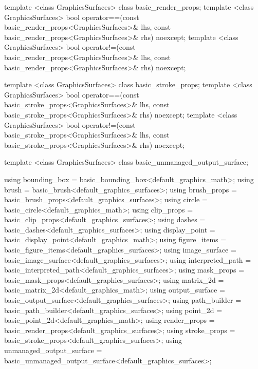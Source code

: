 \begin{codeblock}
{{{{    template <class GraphicsSurfaces>    
    class basic_render_props;
    template <class GraphicsSurfaces>
    bool operator==(const basic_render_props<GraphicsSurfaces>& lhs,
      const basic_render_props<GraphicsSurfaces>& rhs) noexcept;
    template <class GraphicsSurfaces>
    bool operator!=(const basic_render_props<GraphicsSurfaces>& lhs,
      const basic_render_props<GraphicsSurfaces>& rhs) noexcept;
    
    template <class GraphicsSurfaces>
    class basic_stroke_props;
    template <class GraphicsSurfaces>
    bool operator==(const basic_stroke_props<GraphicsSurfaces>& lhs,
      const basic_stroke_props<GraphicsSurfaces>& rhs) noexcept;
    template <class GraphicsSurfaces>
    bool operator!=(const basic_stroke_props<GraphicsSurfaces>& lhs,
      const basic_stroke_props<GraphicsSurfaces>& rhs) noexcept;
    
    template <class GraphicsSurfaces>
    class basic_unmanaged_output_surface;
  
    using bounding_box = basic_bounding_box<default_graphics_math>;
    using brush = basic_brush<default_graphics_surfaces>;
    using brush_props = basic_brush_props<default_graphics_surfaces>;
    using circle = basic_circle<default_graphics_math>;
    using clip_props = basic_clip_props<default_graphics_surfaces>;
    using dashes = basic_dashes<default_graphics_surfaces>;
    using display_point = basic_display_point<default_graphics_math>;
    using figure_items = basic_figure_items<default_graphics_surfaces>;
    using image_surface = basic_image_surface<default_graphics_surfaces>;
    using interpreted_path = basic_interpreted_path<default_graphics_surfaces>;
    using mask_props = basic_mask_props<default_graphics_surfaces>;
    using matrix_2d = basic_matrix_2d<default_graphics_math>;
    using output_surface = basic_output_surface<default_graphics_surfaces>;
    using path_builder = basic_path_builder<default_graphics_surfaces>;
    using point_2d = basic_point_2d<default_graphics_math>;
    using render_props = basic_render_props<default_graphics_surfaces>;
    using stroke_props = basic_stroke_props<default_graphics_surfaces>;
    using unmanaged_output_surface = 
      basic_unmanaged_output_surface<default_graphics_surfaces>;
    
}}}}
\end{codeblock}
